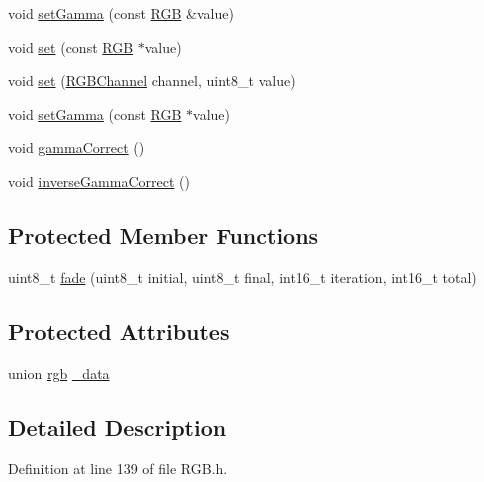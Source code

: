 \begin{DoxyCompactItemize}
\item 
void \hyperlink{classflame_1_1_r_g_b_ae58cbda8540d05b70e066d7715766c8b}{set\-Gamma} (const \hyperlink{classflame_1_1_r_g_b}{R\-G\-B} \&value)
\item 
void \hyperlink{classflame_1_1_r_g_b_a16e70fb1f45ce79e38b8c7f647cd1cc2}{set} (const \hyperlink{classflame_1_1_r_g_b}{R\-G\-B} $\ast$value)
\item 
void \hyperlink{classflame_1_1_r_g_b_a69e0c19e3f5d6742e17fffe66a866927}{set} (\hyperlink{namespaceflame_a47f12f0248f648dbdbfa6fe26d79028d}{R\-G\-B\-Channel} channel, uint8\-\_\-t value)
\item 
void \hyperlink{classflame_1_1_r_g_b_a35a19e8cc502583aa688a9e1236bd409}{set\-Gamma} (const \hyperlink{classflame_1_1_r_g_b}{R\-G\-B} $\ast$value)
\item 
void \hyperlink{classflame_1_1_r_g_b_a66216f39d01050fdc14314790a51108d}{gamma\-Correct} ()
\item 
void \hyperlink{classflame_1_1_r_g_b_a302e896be5c8bfed3e8cca54682280aa}{inverse\-Gamma\-Correct} ()
\end{DoxyCompactItemize}
\subsection*{Protected Member Functions}
\begin{DoxyCompactItemize}
\item 
uint8\-\_\-t \hyperlink{classflame_1_1_r_g_b_a5fc1c274cbfef087d866d6ffb037defb}{fade} (uint8\-\_\-t initial, uint8\-\_\-t final, int16\-\_\-t iteration, int16\-\_\-t total)
\end{DoxyCompactItemize}
\subsection*{Protected Attributes}
\begin{DoxyCompactItemize}
\item 
union \hyperlink{unionflame_1_1rgb}{rgb} \hyperlink{classflame_1_1_r_g_b_a154fae5c9f509c283d2df1a3cff37d55}{\-\_\-data}
\end{DoxyCompactItemize}


\subsection{Detailed Description}


Definition at line 139 of file R\-G\-B.\-h.



